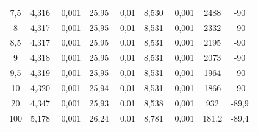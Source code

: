\begin{table}[H]
\begin{tabular}{c | c | c | c | c | c}
		 7,5 & 4,316  \, \clap{$\pm$} \,  0,001 & 25,95  \, \clap{$\pm$} \,  0,01 & 8,530  \, \clap{$\pm$} \,  0,001 & 2488 & -90 \\
		 8 & 4,317  \, \clap{$\pm$} \,  0,001 & 25,95  \, \clap{$\pm$} \,  0,01 & 8,531  \, \clap{$\pm$} \,  0,001 & 2332 & -90 \\
		 8,5 & 4,317  \, \clap{$\pm$} \,  0,001 & 25,95  \, \clap{$\pm$} \,  0,01 & 8,531  \, \clap{$\pm$} \,  0,001 & 2195 & -90 \\
		 9 & 4,318  \, \clap{$\pm$} \,  0,001 & 25,95  \, \clap{$\pm$} \,  0,01 & 8,531  \, \clap{$\pm$} \,  0,001 & 2073 & -90 \\
		 9,5 & 4,319  \, \clap{$\pm$} \,  0,001 & 25,95  \, \clap{$\pm$} \,  0,01 & 8,531  \, \clap{$\pm$} \,  0,001 & 1964 & -90 \\
		 10 & 4,320  \, \clap{$\pm$} \,  0,001 & 25,94  \, \clap{$\pm$} \,  0,01 & 8,531  \, \clap{$\pm$} \,  0,001 & 1866 & -90 \\
		 20 & 4,347  \, \clap{$\pm$} \,  0,001 & 25,93  \, \clap{$\pm$} \,  0,01 & 8,538  \, \clap{$\pm$} \,  0,001 & 932 & -89,9 \\
		 100 & 5,178  \, \clap{$\pm$} \,  0,001 & 26,24  \, \clap{$\pm$} \,  0,01 & 8,781  \, \clap{$\pm$} \,  0,001 & 181,2 & -89,4 \\
		 \bottomrule
	\end{tabular}
\end{table}
